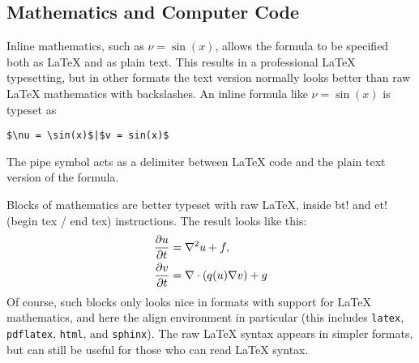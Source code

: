 \documentclass[%
oneside,                 %
final,                   %
10pt]{article}
\begin{document}
\noindent

\subsection{Mathematics and Computer Code}

Inline mathematics, such as $\nu = \sin(x)$,
allows the formula to be specified both as {\LaTeX} and as plain text.
This results in a professional {\LaTeX} typesetting, but in other formats
the text version normally looks better than raw {\LaTeX} mathematics with
backslashes. An inline formula like $\nu = \sin(x)$ is
typeset as
\begin{Verbatim}[fontsize=\fontsize{9pt}{9pt},tabsize=8,baselinestretch=0.85,
fontfamily=tt,xleftmargin=7mm]
$\nu = \sin(x)$|$v = sin(x)$
\end{Verbatim}
\noindent
The pipe symbol acts as a delimiter between {\LaTeX} code and the plain text
version of the formula.

Blocks of mathematics are better typeset with raw {\LaTeX}, inside
{\fontsize{10pt}{10pt}\Verb!!bt!} and {\fontsize{10pt}{10pt}\Verb!!et!} (begin tex / end tex) instructions.
The result looks like this:
\begin{align}
{\partial u\over\partial t} &= \nabla^2 u + f, \label{myeq1}\\
{\partial v\over\partial t} &= \nabla\cdot(q(u)\nabla v) + g
\end{align}
Of course, such blocks only looks nice in formats with support
for {\LaTeX} mathematics, and here the align environment in particular
(this includes {\fontsize{10pt}{10pt}\Verb!latex!}, {\fontsize{10pt}{10pt}\Verb!pdflatex!}, {\fontsize{10pt}{10pt}\Verb!html!}, and {\fontsize{10pt}{10pt}\Verb!sphinx!}). The raw
{\LaTeX} syntax appears in simpler formats, but can still be useful
for those who can read {\LaTeX} syntax.
\end{document}
